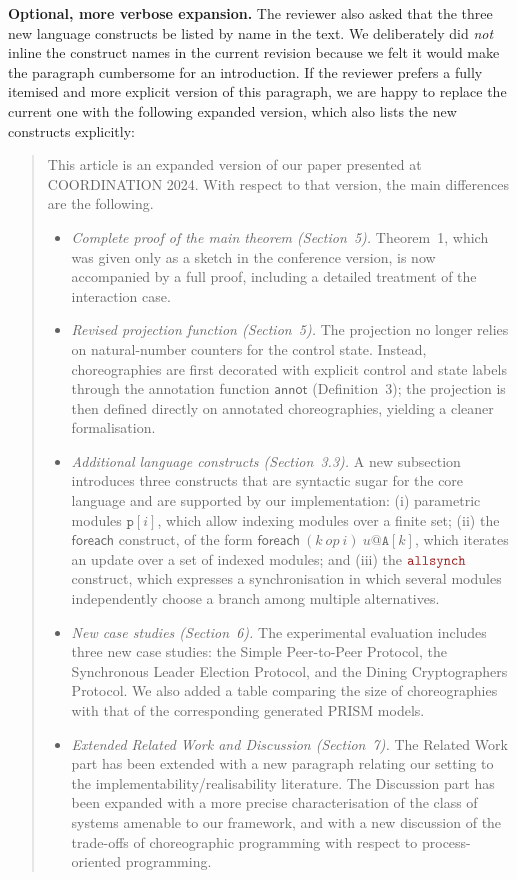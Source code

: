 \documentclass[11pt]{article}
\newcommand{\allsynchName}{\textcolor{bloodyred}{\mathtt{allsynch}}}
\begin{document}
{  \medskip\noindent\textbf{Optional, more verbose expansion.} The
  reviewer also asked that the three new language constructs be
  listed by name in the text. We deliberately did \emph{not} inline
  the construct names in the current revision because we felt it
  would make the paragraph cumbersome for an introduction. If the
  reviewer prefers a fully itemised and more explicit version of
  this paragraph, we are happy to replace the current one with the
  following expanded version, which also lists the new constructs
  explicitly:
  \begin{quote}\small
    This article is an expanded version of our paper presented at
    COORDINATION 2024. With respect to that version, the main
    differences are the following.
    \begin{itemize}
    \item \emph{Complete proof of the main theorem (Section~5).}
      Theorem~1, which was given only as a sketch in the conference
      version, is now accompanied by a full proof, including a
      detailed treatment of the interaction case.
    \item \emph{Revised projection function (Section~5).} The
      projection no longer relies on natural-number counters for the
      control state. Instead, choreographies are first decorated with
      explicit control and state labels through the annotation
      function $\mathsf{annot}$ (Definition~3); the projection is
      then defined directly on annotated choreographies, yielding a
      cleaner formalisation.
    \item \emph{Additional language constructs (Section~3.3).} A new
      subsection introduces three constructs that are syntactic sugar
      for the core language and are supported by our implementation:
      (i) parametric modules $\mathtt{p}[i]$, which allow indexing
      modules over a finite set; (ii) the $\mathsf{foreach}$
      construct, of the form $\mathsf{foreach}\ (k\ \mathit{op}\ i)\
      u@\mathtt{A}[k]$, which iterates an update over a set of
      indexed modules; and (iii) the $\allsynchName$ construct, which
      expresses a synchronisation in which several modules
      independently choose a branch among multiple alternatives.
    \item \emph{New case studies (Section~6).} The experimental
      evaluation includes three new case studies: the Simple
      Peer-to-Peer Protocol, the Synchronous Leader Election
      Protocol, and the Dining Cryptographers Protocol. We also added
      a table comparing the size of choreographies with that of the
      corresponding generated PRISM models.
    \item \emph{Extended Related Work and Discussion (Section~7).}
      The Related Work part has been extended with a new paragraph
      relating our setting to the implementability/realisability
      literature. The Discussion part has been expanded with a more
      precise characterisation of the class of systems amenable to
      our framework, and with a new discussion of the trade-offs of
      choreographic programming with respect to process-oriented
      programming.
    \end{itemize}
  \end{quote}
}
\end{document}
